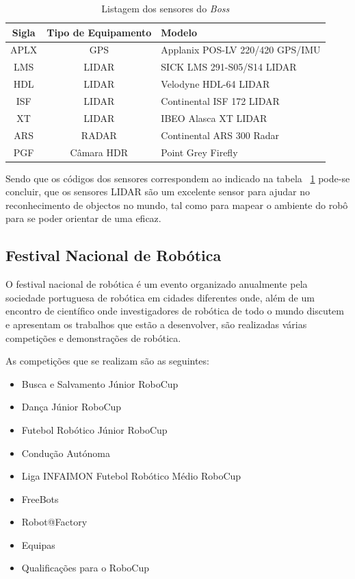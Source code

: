 \begin{table}
\begin{center}
\begin{tabular} { c c l }
	Sigla & Tipo de Equipamento & Modelo \\
	\hline
	APLX & GPS & Applanix POS-LV 220/420 GPS/IMU \\
	LMS & LIDAR & SICK LMS 291-S05/S14 LIDAR \\
	HDL & LIDAR & Velodyne HDL-64 LIDAR \\
	ISF & LIDAR & Continental ISF 172 LIDAR \\
	XT & LIDAR & IBEO Alasca XT LIDAR \\
	ARS & RADAR & Continental ARS 300 Radar \\
	PGF & Câmara HDR & Point Grey Firefly \\
	\hline
\end{tabular}
	\caption{Listagem dos sensores do \emph{Boss}}
	\label{boss_sensor}
\end{center}
\end{table}

Sendo que os códigos dos sensores correspondem ao indicado na tabela ~\ref{boss_sensor}
pode-se concluir, que os sensores LIDAR são um excelente sensor para ajudar no reconhecimento
de objectos no mundo, tal como para mapear o ambiente do robô para se poder orientar de uma eficaz.


\subsection{Festival Nacional de Robótica}

O festival nacional de robótica é um evento organizado anualmente pela sociedade
portuguesa de robótica em cidades diferentes onde, além de um encontro de científico
onde investigadores de robótica de todo o mundo discutem e apresentam os trabalhos
que estão a desenvolver, são realizadas várias competições e demonstrações de robótica.

As competições que se realizam são as seguintes:
\begin{itemize}
\item    Busca e Salvamento Júnior RoboCup
\item    Dança Júnior RoboCup
\item    Futebol Robótico Júnior RoboCup
\item    Condução Autónoma
\item    Liga INFAIMON Futebol Robótico Médio RoboCup
\item    FreeBots
\item    Robot@Factory
\item    Equipas
\item    Qualificações para o RoboCup
\end{itemize}

